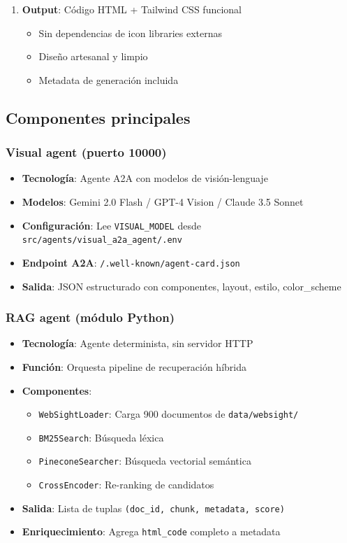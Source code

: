 \documentclass[12pt,a4paper]{article}
\begin{document}
\begin{enumerate}
    \item \textbf{Output}: Código HTML + Tailwind CSS funcional
    \begin{itemize}
        \item Sin dependencias de icon libraries externas
        \item Diseño artesanal y limpio
        \item Metadata de generación incluida
    \end{itemize}
\end{enumerate}

\subsection{Componentes principales}

\subsubsection{Visual agent (puerto 10000)}
\begin{itemize}
    \item \textbf{Tecnología}: Agente A2A con modelos de visión-lenguaje
    \item \textbf{Modelos}: Gemini 2.0 Flash / GPT-4 Vision / Claude 3.5 Sonnet
    \item \textbf{Configuración}: Lee \texttt{VISUAL\_MODEL} desde \texttt{src/agents/visual\_a2a\_agent/.env}
    \item \textbf{Endpoint A2A}: \texttt{/.well-known/agent-card.json}
    \item \textbf{Salida}: JSON estructurado con componentes, layout, estilo, color\_scheme
\end{itemize}

\subsubsection{RAG agent (módulo Python)}
\begin{itemize}
    \item \textbf{Tecnología}: Agente determinista, sin servidor HTTP
    \item \textbf{Función}: Orquesta pipeline de recuperación híbrida
    \item \textbf{Componentes}:
    \begin{itemize}
        \item \texttt{WebSightLoader}: Carga 900 documentos de \texttt{data/websight/}
        \item \texttt{BM25Search}: Búsqueda léxica
        \item \texttt{PineconeSearcher}: Búsqueda vectorial semántica
        \item \texttt{CrossEncoder}: Re-ranking de candidatos
    \end{itemize}
    \item \textbf{Salida}: Lista de tuplas \texttt{(doc\_id, chunk, metadata, score)}
    \item \textbf{Enriquecimiento}: Agrega \texttt{html\_code} completo a metadata
\end{itemize}
\end{document}

